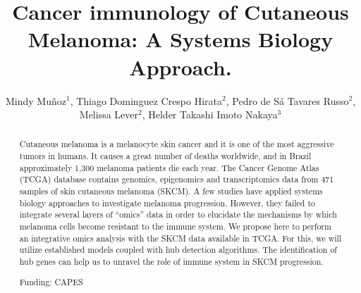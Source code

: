 \documentclass[twoside]{article}
\title{\vspace{-15mm}\fontsize{24pt}{10pt}\selectfont\textbf{Cancer immunology of Cutaneous Melanoma: A Systems Biology Approach.}} %
\author{Mindy Mu\~noz$^1$, Thiago Dominguez Crespo Hirata$^2$, Pedro de S\'a Tavares Russo$^2$, Melissa Lever$^2$, Helder Takashi Imoto Nakaya$^3$}
\affil{1 COMPUTATIONAL SYSTEMS BIOLOGY LABORATORY - FACULDADE DE CI\^ENCIAS FARMAC\^EUTICAS,USP\\ 2 USP\\ }
\date{}
\begin{document}
\maketitle %

\thispagestyle{fancy} %


\begin{abstract}
Cutaneous melanoma is a melanocyte skin cancer and it is one of the most aggressive tumors in humans. It causes a great number of deaths worldwide, and in Brazil approximately 1,300 melanoma patients die each year. The Cancer Genome Atlas (TCGA) database contains genomics, epigenomics and transcriptomics data from 471 samples of skin cutaneous melanoma (SKCM). A few studies have applied systems biology approaches to investigate melanoma progression. However, they failed to integrate several layers of ``omics'' data in order to elucidate the mechanisms by which melanoma cells become resistant to the immune system. We propose here to perform an integrative omics analysis with the SKCM data available in TCGA. For this, we will utilize established models coupled with hub detection algorithms. The identification of hub genes can help us to unravel the role of immune system in SKCM progression.

Funding: CAPES
\end{abstract}
\end{document}
